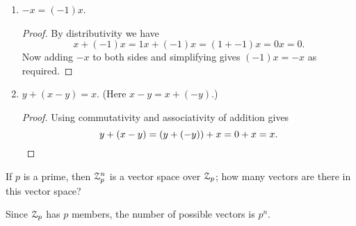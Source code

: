 \begin{enumerate}
\begin{proof}
    \begin{equation*}
      1x = x = 0,
    \end{equation*}
    completing the proof.
  \end{proof}
\item $-x = (-1)x$.
  \begin{proof}
    By distributivity we have
    \begin{equation*}
      x + (-1)x = 1x + (-1)x = (1 + -1)x = 0x = 0.
    \end{equation*}
    Now adding $-x$ to both sides and simplifying gives $(-1)x = -x$
    as required.
  \end{proof}
\item $y + (x - y) = x$. (Here $x - y = x + (-y)$.)
  \begin{proof}
    Using commutativity and associativity of addition gives
    \begin{equation*}
      y + (x - y) = (y + (-y)) + x = 0 + x = x.\qedhere
    \end{equation*}
  \end{proof}
\end{enumerate}

 If $p$ is a prime, then $\mathcal{Z}_p^n$ is a vector space over
$\mathcal{Z}_p$; how many vectors are there in this vector space?
\begin{solution}
  Since $\mathcal{Z}_p$ has $p$ members, the number of possible vectors is
  $p^n$.
\end{solution}
